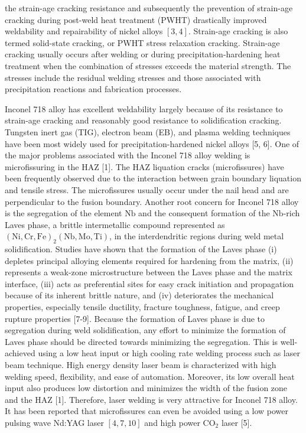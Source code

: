 \documentclass[10pt]{article}
\begin{document}
the strain-age cracking resistance and subsequently the prevention of strain-age cracking during post-weld heat treatment (PWHT) drastically improved weldability and repairability of nickel alloys $[3,4]$. Strain-age cracking is also termed solid-state cracking, or PWHT stress relaxation cracking. Strain-age cracking usually occurs after welding or during precipitation-hardening heat treatment when the combination of stresses exceeds the material strength. The stresses include the residual welding stresses and those associated with precipitation reactions and fabrication processes.

Inconel 718 alloy has excellent weldability largely because of its resistance to strain-age cracking and reasonably good resistance to solidification cracking. Tungsten inert gas (TIG), electron beam (EB), and plasma welding techniques have been most widely used for precipitation-hardened nickel alloys [5, 6]. One of the major problems associated with the Inconel 718 alloy welding is microfissuring in the HAZ [1]. The HAZ liquation cracks (microfissures) have been frequently observed due to the interaction between grain boundary liquation and tensile stress. The microfissures usually occur under the nail head and are perpendicular to the fusion boundary. Another root concern for Inconel 718 alloy is the segregation of the element $\mathrm{Nb}$ and the consequent formation of the $\mathrm{Nb}$-rich Laves phase, a brittle intermetallic compound represented as $(\mathrm{Ni}, \mathrm{Cr}, \mathrm{Fe})_{2}(\mathrm{Nb}, \mathrm{Mo}, \mathrm{Ti})$, in the interdendritic regions during weld metal solidification. Studies have shown that the formation of the Laves phase (i) depletes principal alloying elements required for hardening from the matrix, (ii) represents a weak-zone microstructure between the Laves phase and the matrix interface, (iii) acts as preferential sites for easy crack initiation and propagation because of its inherent brittle nature, and (iv) deteriorates the mechanical properties, especially tensile ductility, fracture toughness, fatigue, and creep rupture properties [7-9]. Because the formation of Laves phase is due to segregation during weld solidification, any effort to minimize the formation of Laves phase should be directed towards minimizing the segregation. This is well-achieved using a low heat input or high cooling rate welding process such as laser beam technique. High energy density laser beam is characterized with high welding speed, flexibility, and ease of automation. Moreover, its low overall heat input also produces low distortion and minimizes the width of the fusion zone and the HAZ [1]. Therefore, laser welding is very attractive for Inconel 718 alloy. It has been reported that microfissures can even be avoided using a low power pulsing wave Nd:YAG laser $[4,7,10]$ and high power $\mathrm{CO}_{2}$ laser [5].
\end{document}
